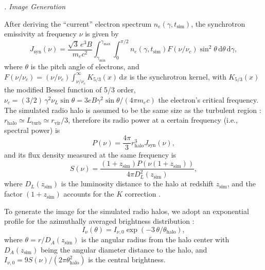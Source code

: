 \documentclass[modern]{aastex62}
\newcommand{\R}[1]{\mathrm{#1}}
\newcommand{\D}[1]{\R{d} #1}
\newcounter{sssseccount}
\newcommand{\sssseclabel}{\alph{sssseccount}}
\newcommand{\ssssec}[1]{%
  \vspace{1ex}%
  \stepcounter{sssseccount}%
  \noindent\emph{\sssseclabel. #1}%
}
\begin{document}
\ssssec{Image Generation}

After deriving the \enquote{current} electron spectrum
$n_e(\gamma, t_{\R{sim}})$, the synchrotron emissivity at frequency
$\nu$ is given by \citep{rybicki1979}
\begin{equation}
  \label{sec:jnu-sync}
  J_{\R{syn}}(\nu) = \frac{\sqrt{3} \, e^3 B}{m_e c^2}
    \!\int_{\gamma_{\R{min}}}^{\gamma_{\R{max}}} \!\!\!\int_0^{\pi/2}\!
    n_e(\gamma, t_{\R{sim}}) F(\nu/\nu_c)
    \sin^2 \!\theta \,\D{\theta} \,\D{\gamma},
\end{equation}
where $\theta$ is the pitch angle of electrons,
and $F(\nu/\nu_c) = (\nu/\nu_c) \int_{\nu/\nu_c}^{\infty} K_{5/3}(x) \,\D{x}$
is the synchrotron kernel,
with $K_{5/3}(x)$ the modified Bessel function of 5/3 order,
$\nu_c = (3/2) \,\gamma^2 \nu_L \sin\theta
= 3 e B \gamma^2 \sin\theta / (4\pi m_e c)$
the electron's critical frequency.
The simulated radio halo is assumed to be the same size as the turbulent
region \citep[e.g.,][]{vazza2011}:
$r_{\R{halo}} \simeq L_{\R{turb}} \simeq r_{\R{vir}}/3$,
therefore its radio power at a certain frequency (i.e., spectral power) is
\begin{equation}
  \label{eq:halo-power}
  P(\nu) = \frac{4\pi}{3} r_{\R{halo}}^3 J_{\R{syn}}(\nu),
\end{equation}
and its flux density measured at the same frequency is
\begin{equation}
  \label{eq:halo-flux}
  S(\nu) = \frac{(1+z_{\R{sim}}) P(\nu(1+z_{\R{sim}}))}{4\pi D_{\!L}^2(z_{\R{sim}})},
\end{equation}
where $D_{\!L}(z_{\R{sim}})$ is the luminosity distance to the halo at
redshift $z_{\R{sim}}$,
and the factor $(1 + z_{\R{sim}})$ accounts for the $K$ correction
\citep[e.g.,][]{hogg1999}.

To generate the image for the simulated radio halos, we adopt an
exponential profile for the azimuthally averaged brightness distribution
\citep{murgia2009}:
\begin{equation}
  \label{eq:halo-profile}
  I_{\nu}(\theta) = I_{\nu,0} \exp(-3 \,\theta / \theta_{\R{halo}}),
\end{equation}
where $\theta = r / D_{\!A}(z_{\R{sim}})$ is the angular radius from the
halo center with $D_{\!A}(z_{\R{sim}})$ being the angular diameter
distance to the halo,
and $I_{\nu,0} = 9 S(\nu) / (2\pi \theta^2_{\R{halo}})$ is the central
brightness.
\end{document}
